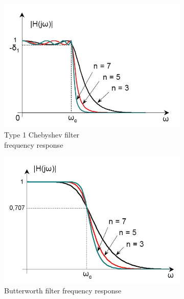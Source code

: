 \begin{figure}[h]
	\centering
	\begin{subfigure}{.4\textwidth}
	  	\centering
	  	\includegraphics[width=1\linewidth]{Figures/chebyshev.jpeg}
	  	\caption{Type 1 Chebyshev filter \\frequency response}
	  	\label{fig:sub1}
	\end{subfigure}
	\hfill
	\begin{subfigure}{.4\textwidth}
	  	\centering
	  	\includegraphics[width=1\linewidth]{Figures/butterworth.jpeg}
	  	\caption{Butterworth filter frequency response}
	  	\label{fig:sub2}
	\end{subfigure}
	\hfill
	\begin{subfigure}{.4\textwidth}
		\centering

\end{subfigure}
\end{figure}
